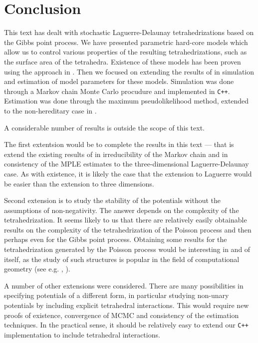 \chapter*{Conclusion}

This text has dealt with stochastic Laguerre-Delaunay tetrahedrizations based on the Gibbs point process. We have presented parametric hard-core models which allow us to control various properties of the resulting tetrahedrizations, such as the surface area of the tetrahedra. Existence of these models has been proven using the approach in \cite{DDG12}. Then we focused on extending the results of \cite{DereudreLavancier2011} in simulation and estimation of model parameters for these models. Simulation was done through a Markov chain Monte Carlo procudure and implemented in \texttt{C++}. Estimation was done through the maximum pseudolikelihood method, extended to the non-hereditary case in \cite{DereudreLavancier2009}.


A considerable number of results is outside the scope of this text.

The first extentsion would be to complete the results in this text --- that is extend the existing results of \cite{DereudreLavancier2009}  in irreducibility of the Markov chain and \cite{DereudreLavancier2011} in consistency of the MPLE estimates to the three-dimensional Laguerre-Delaunay case. As with existence, it is likely the case that the extension to Laguerre would be easier than the extension to three dimensions. 

Second extension is to study the stability of the potentials without the assumptions of non-negativity. The answer depends on the complexity of the tetrahedrization. It seems likely to us that there are relatively easily obtainable results on the complexity of the tetrahedrization of the Poisson process and then perhaps even for the Gibbs point process. Obtaining some results for the tetrahedrization generated by the Poisson process would be interesting in and of itself, as the study of such structures is popular in the field of computational geometry (see e.g. \cite{Amenta07}, \cite{Erickson05}).

A number of other extensions were considered. There are many possibilities in specifying potentials of a different form, in particular studying non-unary potentials by including explicit tetrahedral interactions. This would require new proofs of existence, convergence of MCMC and consistency of the estimation techniques. In the practical sense, it should be relatively easy to extend our \texttt{C++} implementation to include tetrahedral interactions.

